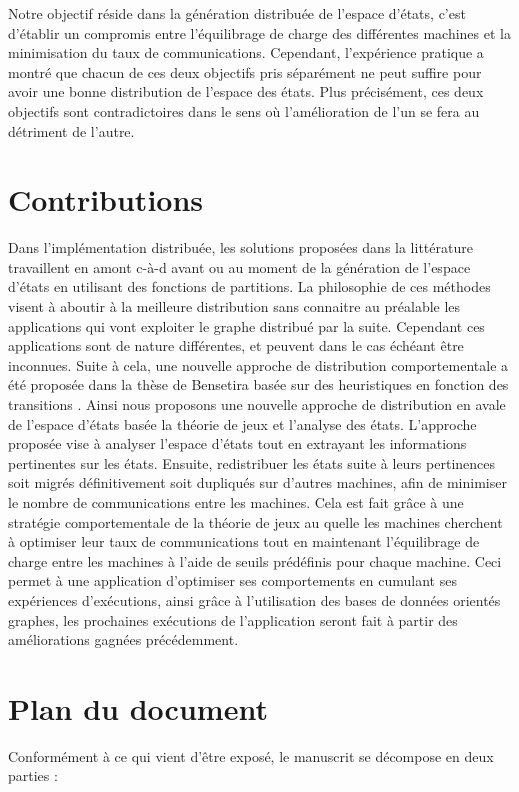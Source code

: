 Notre objectif réside dans la génération distribuée de l'espace d'états, c'est d’établir un compromis entre l’équilibrage de charge des différentes machines et la minimisation du taux de communications. Cependant, l’expérience pratique a montré que chacun de ces deux objectifs pris séparément ne peut suffire pour avoir une bonne distribution de l’espace des états. Plus précisément, ces deux objectifs sont contradictoires dans le sens où l'amélioration de l'un se fera au détriment de l'autre.

\section*{Contributions}

Dans l’implémentation distribuée, les solutions proposées dans la littérature travaillent en amont c-à-d avant ou au moment de la génération de l’espace d’états en utilisant des fonctions de partitions. La philosophie de ces méthodes visent à aboutir à la meilleure distribution sans connaitre au préalable les applications qui vont exploiter le graphe distribué par la suite. Cependant ces applications sont de nature différentes, et peuvent dans le cas échéant être inconnues. Suite à cela, une nouvelle approche de distribution comportementale a été proposée dans la thèse de Bensetira basée sur des heuristiques en fonction des transitions \citep{BENSETIRA2017}. Ainsi nous proposons une nouvelle approche de distribution en avale de l'espace d'états basée la théorie de jeux et l'analyse des états. L’approche proposée vise à analyser l'espace d’états tout en extrayant les informations pertinentes sur les états. Ensuite, redistribuer les états suite à leurs pertinences soit migrés définitivement soit dupliqués sur d’autres machines, afin de minimiser le nombre de communications entre les machines. Cela est fait grâce à une stratégie comportementale de la théorie de jeux au quelle les machines cherchent à optimiser leur taux de communications tout en maintenant l'équilibrage de charge entre les machines à l’aide de seuils prédéfinis pour chaque machine. Ceci permet à une application d'optimiser ses comportements en cumulant ses expériences d’exécutions, ainsi grâce à l'utilisation des bases de données orientés graphes, les prochaines exécutions de l’application seront fait à partir des améliorations gagnées précédemment.

\section*{Plan du document}
Conformément à ce qui vient d’être exposé, le manuscrit se décompose en deux parties :

